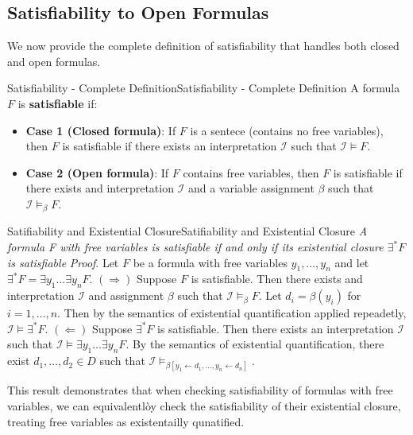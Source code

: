 \documentclass[a4paper]{article}
\theoremstyle{definition}
\begin{document}
\subsection{Satisfiability to Open Formulas}
We now provide the complete definition of satisfiability that handles both closed and open formulas.
\begin{definition}{Satisfiability - Complete Definition}{Satisfiability - Complete Definition}
A formula \( F \) is \textbf{satisfiable} if:
\begin{itemize}
	\item \textbf{Case 1 (Closed formula)}: If \( F \) is a sentece (contains no free variables), then \( F \) is satisfiable if there exists an interpretation \( \mathcal{I} \) such that \( \mathcal{I} \models F \).
	\item \textbf{Case 2 (Open formula)}: If \( F \) contains free variables, then \( F \) is satisfiable if there exists and interpretation \( \mathcal{I} \) and a variable assignment \( \beta \) such that \( \mathcal{I} \models_{\beta} F \).
\end{itemize}
\end{definition}
\begin{theorem}{Satifiability and Existential Closure}{Satifiability and Existential Closure}
\textit{A formula F with free variables is satisfiable if and only if its existential closure \( \exists^* F \) is satisfiable}
\vspace{1em}
\noindent
\newline
\textit{Proof}. Let \(F \) be a formula with free variables \( y_1, \ldots, y_n \) and let \( \exists^* F = \exists y_1 \ldots \exists y_n F \).
\vspace{1em}
\noindent
\newline
\( (\Rightarrow) \) Suppose \( F \) is satisfiable. Then there exists and interpretation \( \mathcal{I} \) and assignment \( \beta \) such that 
\( \mathcal{I} \models_{\beta} F \). Let \( d_i = \beta(y_i) \) for \( i = 1, \ldots, n \). Then by the semantics of existential quantification applied repeadetly, \( \mathcal{I} \models \exists^* F \).
\vspace{1em}
\noindent
\newline
\( (\Leftarrow) \) Suppose \( \exists^* F \) is satisfiable. Then there exists an interpretation \( \mathcal{I} \) such that \( \mathcal{I} \models \exists y_1 \ldots \exists y_n F \).
By the semantics of existential quantification, there exist \( d_1, \ldots, d_2 \in D \) such that \( \mathcal{I} \models_{\beta[y_1 \leftarrow d_1, \ldots, y_n \leftarrow d_n]} \).
\end{theorem}
This result demonstrates that when checking satisfiability of formulas with free variables, we can equivalentlòy check the satisfiability of their existential closure, treating free 
variables as existentailly qunatified.
\end{document}

